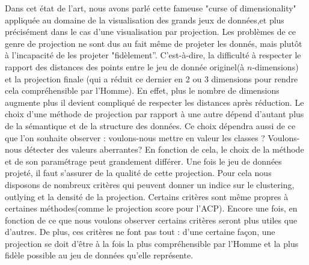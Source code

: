 Dans cet état de l’art, nous avons parlé cette fameuse "curse of dimensionality" appliquée au domaine de la visualisation des grands jeux de données,et plus précisément dans le cas d'une visualisation par projection. 
Les problèmes de ce genre de projection ne sont dus au fait même de projeter les donnés, mais plutôt à l'incapacité de les projeter "fidèlement”. C’est-à-dire, la difficulté à respecter le rapport des distances des points entre le jeu de donnée originel(à $n$-dimensions) et la projection finale (qui a réduit ce dernier en 2 ou 3 dimensions pour rendre cela compréhensible par l’Homme).
En effet, plus le nombre de dimensions augmente plus il devient compliqué de respecter les distances après réduction.
\newline
Le choix d’une méthode de projection par rapport à une autre dépend d'autant plus de la sémantique et de la structure des données. Ce choix dépendra aussi de ce que l’on souhaite observer : voulons-nous mettre en valeur les classes ? Voulons-nous détecter des valeurs aberrantes? 
En fonction de cela, le choix de la méthode et de son paramétrage peut grandement différer.
\smallskip
Une fois le jeu de données projeté, il faut s’assurer de la qualité de cette projection.
Pour cela nous disposons de nombreux critères qui peuvent donner un indice sur le clustering, outlying et la densité de la projection. Certains critères sont même propres à certaines méthodes(comme le projection score pour l'ACP).
Encore une fois, en fonction de ce que nous voulons observer certains critères seront plus utiles que d'autres. De plus, ces critères ne font pas tout : d’une certaine façon, une projection se doit d’être à la fois la plus compréhensible par l’Homme et la plus fidèle possible au jeu de données qu’elle représente.


